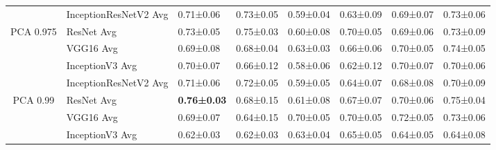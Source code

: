 \begin{landscape}
\begin{table}[]
\begin{tabular}{clllllll}
                            & InceptionResNetV2 Avg              & 0.71±0.06                                  & 0.73±0.05                         & 0.59±0.04                         & 0.63±0.09                         & 0.69±0.07                         & 0.73±0.06                         \\
\multirow{-4}{*}{PCA 0.975} & ResNet Avg                         & 0.73±0.05                                  & 0.75±0.03                         & 0.60±0.08                         & 0.70±0.05                         & 0.69±0.06                         & 0.73±0.09                         \\
                            & VGG16 Avg                          & 0.69±0.08                                  & 0.68±0.04                         & 0.63±0.03                         & 0.66±0.06                         & 0.70±0.05                         & 0.74±0.05                         \\
                            & InceptionV3 Avg                    & 0.70±0.07                                  & 0.66±0.12                         & 0.58±0.06                         & 0.62±0.12                         & 0.70±0.07                         & 0.70±0.06                         \\
                            & InceptionResNetV2 Avg              & 0.71±0.06                                  & 0.72±0.05                         & 0.59±0.05                         & 0.64±0.07                         & 0.68±0.08                         & 0.70±0.09                         \\
\multirow{-4}{*}{PCA 0.99}  & \cellcolor[HTML]{E7E6E6}ResNet Avg & \cellcolor[HTML]{E7E6E6}\textbf{0.76±0.03} & \cellcolor[HTML]{E7E6E6}0.68±0.15 & \cellcolor[HTML]{E7E6E6}0.61±0.08 & \cellcolor[HTML]{E7E6E6}0.67±0.07 & \cellcolor[HTML]{E7E6E6}0.70±0.06 & \cellcolor[HTML]{E7E6E6}0.75±0.04 \\
                            & VGG16 Avg                          & 0.69±0.07                                  & 0.64±0.15                         & 0.70±0.05                         & 0.70±0.05                         & 0.72±0.05                         & 0.73±0.06                         \\
                            & InceptionV3 Avg                    & 0.62±0.03                                  & 0.62±0.03                         & 0.63±0.04                         & 0.65±0.05                         & 0.64±0.05                         & 0.64±0.08                         \\

\end{tabular}
\end{table}
\end{landscape}
